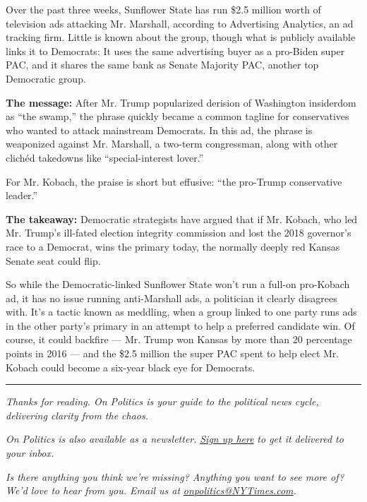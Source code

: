 Over the past three weeks, Sunflower State has run \$2.5 million worth
of television ads attacking Mr. Marshall, according to Advertising
Analytics, an ad tracking firm. Little is known about the group, though
what is publicly available links it to Democrats: It uses the same
advertising buyer as a pro-Biden super PAC, and it shares the same bank
as Senate Majority PAC, another top Democratic group.

\textbf{The message:} After Mr. Trump popularized derision of Washington
insiderdom as ``the swamp,'' the phrase quickly became a common tagline
for conservatives who wanted to attack mainstream Democrats. In this ad,
the phrase is weaponized against Mr. Marshall, a two-term congressman,
along with other clichéd takedowns like ``special-interest lover.''

For Mr. Kobach, the praise is short but effusive: ``the pro-Trump
conservative leader.''

\textbf{The takeaway:} Democratic strategists have argued that if Mr.
Kobach, who led Mr. Trump's ill-fated election integrity commission and
lost the 2018 governor's race to a Democrat, wins the primary today, the
normally deeply red Kansas Senate seat could flip.

So while the Democratic-linked Sunflower State won't run a full-on
pro-Kobach ad, it has no issue running anti-Marshall ads, a politician
it clearly disagrees with. It's a tactic known as meddling, when a group
linked to one party runs ads in the other party's primary in an attempt
to help a preferred candidate win. Of course, it could backfire --- Mr.
Trump won Kansas by more than 20 percentage points in 2016 --- and the
\$2.5 million the super PAC spent to help elect Mr. Kobach could become
a six-year black eye for Democrats.

\begin{center}\rule{0.5\linewidth}{\linethickness}\end{center}

\emph{Thanks for reading. On Politics is your guide to the political
news cycle, delivering clarity from the chaos.}

\emph{On Politics is also available as a newsletter.}
\href{https://www.nytimes3xbfgragh.onion/newsletters/politics}{\emph{Sign
up here}} \emph{to get it delivered to your inbox.}

\emph{Is there anything you think we're missing? Anything you want to
see more of? We'd love to hear from you. Email us at}
\href{mailto:onpolitics@NYTimes.com}{\emph{onpolitics@NYTimes.com}}\emph{.}


